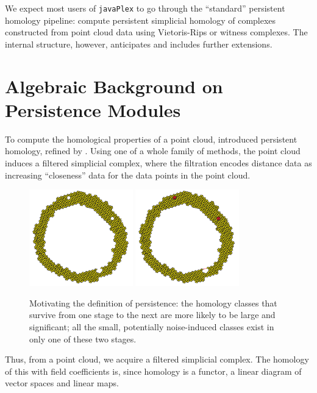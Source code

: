 \documentclass{gts2012}
\newcommand\javaPlex{\texttt{javaPlex}\xspace}
\begin{document}
We expect most users of \javaPlex to go through the ``standard'' persistent homology pipeline: compute persistent simplicial homology of complexes constructed from point cloud data using Vietoris-Rips or witness complexes. The internal structure, however, anticipates and includes further extensions.



\section{Algebraic Background on Persistence Modules}

To compute the homological properties of a point cloud,
\cite{ELZ_02} introduced persistent homology, refined by
\cite{Carlsson_04}. Using one of a whole family of methods, the point
cloud induces a filtered simplicial complex, where the filtration
encodes distance data as increasing ``closeness'' data for the data
points in the point cloud.

\begin{figure}[h]
  \centering
  \includegraphics[width=0.4\textwidth]{images/perripstwo}
  \includegraphics[width=0.4\textwidth]{images/perripsthree}
  \caption{Motivating the definition of persistence: the homology classes that survive from one stage to the next are more likely to be large and significant; all the small, potentially noise-induced classes exist in only one of these two stages.}
  \label{fig:betti3}
\end{figure}

Thus, from a point cloud, we acquire a filtered simplicial
complex. The homology of this with field coefficients is, since
homology is a functor, a linear diagram of vector spaces and linear
maps. 
\end{document}
